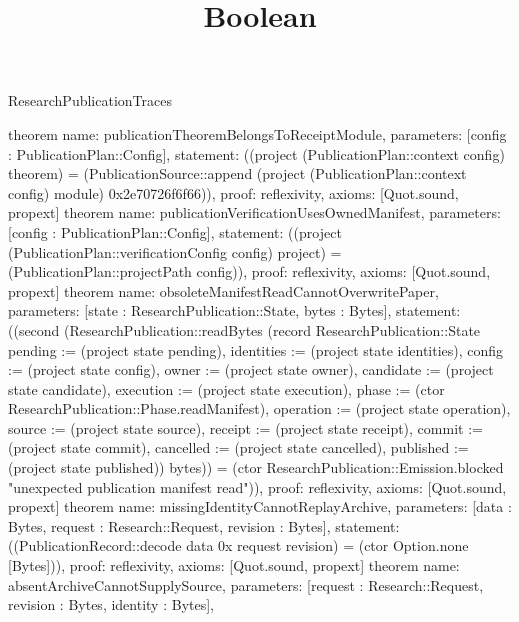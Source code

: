 \begin{lexlean}{ResearchPublicationTraces}
\title{Boolean}
\begin{semanticmodule}
theorem{
 name: publicationTheoremBelongsToReceiptModule,
 parameters: [config : PublicationPlan::Config],
 statement: ((project (PublicationPlan::context config) theorem) = (PublicationSource::append (project (PublicationPlan::context config) module) 0x2e70726f6f66)),
 proof: reflexivity{},
 axioms: [Quot.sound, propext]
}
theorem{
 name: publicationVerificationUsesOwnedManifest,
 parameters: [config : PublicationPlan::Config],
 statement: ((project (PublicationPlan::verificationConfig config) project) = (PublicationPlan::projectPath config)),
 proof: reflexivity{},
 axioms: [Quot.sound, propext]
}
theorem{
 name: obsoleteManifestReadCannotOverwritePaper,
 parameters: [state : ResearchPublication::State, bytes : Bytes],
 statement: ((second (ResearchPublication::readBytes (record ResearchPublication::State {pending := (project state pending), identities := (project state identities), config := (project state config), owner := (project state owner), candidate := (project state candidate), execution := (project state execution), phase := (ctor ResearchPublication::Phase.readManifest), operation := (project state operation), source := (project state source), receipt := (project state receipt), commit := (project state commit), cancelled := (project state cancelled), published := (project state published)}) bytes)) = (ctor ResearchPublication::Emission.blocked "unexpected publication manifest read")),
 proof: reflexivity{},
 axioms: [Quot.sound, propext]
}
theorem{
 name: missingIdentityCannotReplayArchive,
 parameters: [data : Bytes, request : Research::Request, revision : Bytes],
 statement: ((PublicationRecord::decode data 0x request revision) = (ctor Option.none [Bytes])),
 proof: reflexivity{},
 axioms: [Quot.sound, propext]
}
theorem{
 name: absentArchiveCannotSupplySource,
 parameters: [request : Research::Request, revision : Bytes, identity : Bytes],
}
\end{semanticmodule}
\end{lexlean}
